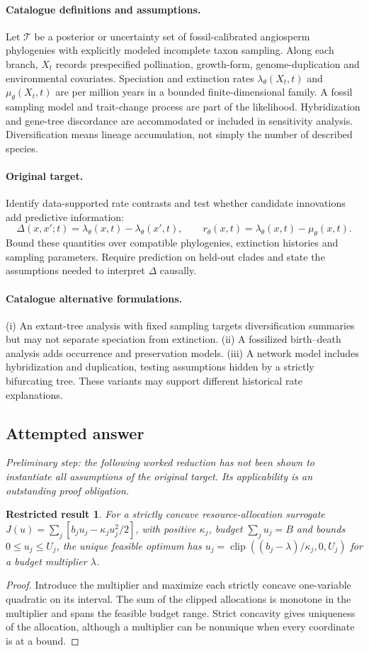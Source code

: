 \documentclass[11pt]{article}
\newtheorem{attemptresult}{Restricted result}[section]
\begin{document}
\paragraph{Catalogue definitions and assumptions.}
Let $\mathcal T$ be a posterior or uncertainty set of fossil-calibrated angiosperm phylogenies with explicitly modeled incomplete taxon sampling. Along each branch, $X_t$ records prespecified pollination, growth-form, genome-duplication and environmental covariates. Speciation and extinction rates $\lambda_\theta(X_t,t)$ and $\mu_\theta(X_t,t)$ are per million years in a bounded finite-dimensional family. A fossil sampling model and trait-change process are part of the likelihood. Hybridization and gene-tree discordance are accommodated or included in sensitivity analysis. Diversification means lineage accumulation, not simply the number of described species.
\paragraph{Original target.}
Identify data-supported rate contrasts and test whether candidate innovations add predictive information:
    \[\Delta(x,x';t)=\lambda_\theta(x,t)-\lambda_\theta(x',t),\qquad
    r_\theta(x,t)=\lambda_\theta(x,t)-\mu_\theta(x,t).\]
    Bound these quantities over compatible phylogenies, extinction histories and sampling parameters. Require prediction on held-out clades and state the assumptions needed to interpret $\Delta$ causally.
\paragraph{Catalogue alternative formulations.}
(i) An extant-tree analysis with fixed sampling targets diversification summaries but may not separate speciation from extinction. (ii) A fossilized birth--death analysis adds occurrence and preservation models. (iii) A network model includes hybridization and duplication, testing assumptions hidden by a strictly bifurcating tree. These variants may support different historical rate explanations.
\subsection{Attempted answer}
\noindent\emph{Preliminary step: the following worked reduction has not been shown to instantiate all assumptions of the original target. Its applicability is an outstanding proof obligation.}

\begin{attemptresult}
For a strictly concave resource-allocation surrogate $J(u)=\sum_j[b_ju_j-\kappa_j u_j^2/2]$, with positive $\kappa_j$, budget $\sum_ju_j=B$ and bounds $0\leq u_j\leq U_j$, the unique feasible optimum has $u_j=\operatorname{clip}((b_j-\lambda)/\kappa_j,0,U_j)$ for a budget multiplier $\lambda$.
\end{attemptresult}
\begin{proof}
Introduce the multiplier and maximize each strictly concave one-variable quadratic on its interval. The sum of the clipped allocations is monotone in the multiplier and spans the feasible budget range. Strict concavity gives uniqueness of the allocation, although a multiplier can be nonunique when every coordinate is at a bound.
\end{proof}
\end{document}
